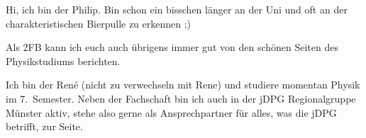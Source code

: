 \begin{multicols*}{2}
{Hi, ich bin der Philip. Bin schon ein bisschen länger an der Uni und oft an der charakteristischen Bierpulle zu erkennen ;)

Als 2FB kann ich euch auch übrigens immer gut von den schönen Seiten des Physikstudiums berichten.
\vspace{\baselineskip}}

{Ich bin der René (nicht zu verwechseln mit Rene) und studiere momentan Physik im 7.~Semester.
	Neben der Fachschaft bin ich auch in der jDPG Regionalgruppe Münster aktiv, stehe also gerne als Ansprechpartner für alles, was die jDPG betrifft, zur Seite.
	\vspace{\baselineskip}}


\end{multicols*}
